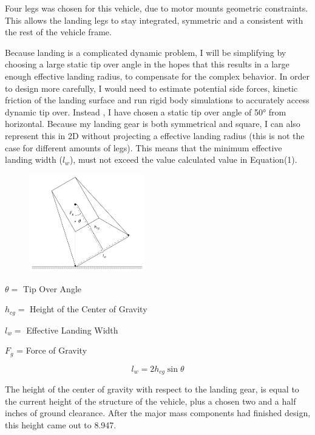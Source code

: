 \documentclass[12pt,letterpaper]{article}
\begin{document}
Four legs was chosen for this vehicle, due to motor mounts geometric constraints. This allows the landing legs to stay integrated, symmetric and a consistent with the rest of the vehicle frame.

Because landing is a complicated dynamic problem, I will be simplifying by choosing a large static tip over angle in the hopes that this results in a large enough effective landing radius, to compensate for the complex behavior. In order to design more carefully, I would need to estimate potential side forces, kinetic friction of the landing surface and run rigid body simulations to accurately access dynamic tip over. Instead , I have chosen a static tip over angle of 50\unit{\degree} from horizontal. Because my landing gear is both symmetrical and square, I can also represent this in 2D without projecting a effective landing radius (this is not the case for different amounts of legs). This means that the minimum effective landing width ($l_w$), must not exceed the value calculated value in Equation(1).

\pagebreak

\begin{figure}[h!]
\centering
\includegraphics[width = 0.45\textwidth]{Landing_Legs_Fig/Tip_Over.pdf}
\end{figure}
\begin{description}
    \item $\theta = $ Tip Over Angle 
    \item $h_{cg} =$ Height of the Center of Gravity 
    \item $l_w = $ Effective Landing Width
    \item $F_g$ = Force of Gravity
\end{description}

\begin{equation}
    l_w = 2 h_{cg} \sin{\theta}
\end{equation}

The height of the center of gravity with respect to the landing gear, is equal to the current height of the structure of the vehicle, plus a chosen two and a half inches of ground clearance. After the major mass components had finished design, this height came out to 8.947\unit{\inch}.
\end{document}

